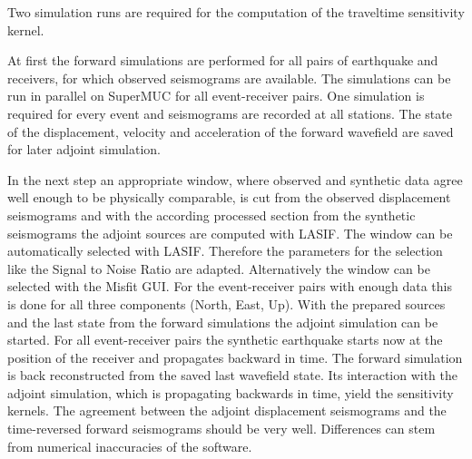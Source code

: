 Two simulation runs are required for the computation of the traveltime sensitivity kernel.

At first the forward simulations are performed for all pairs of earthquake and receivers, for which observed seismograms are available.
The simulations can be run in parallel on SuperMUC for all event-receiver pairs. 
One simulation is required for every event and seismograms are recorded at all stations. %
The state of the displacement, velocity and acceleration of the forward wavefield are saved for later adjoint simulation.

In the next step an appropriate window, where observed and synthetic data agree well enough to be physically comparable,
is cut from the observed displacement seismograms and with the according processed section from the synthetic seismograms 
the adjoint sources are computed with LASIF.
The window can be automatically selected with LASIF. 
Therefore the parameters for the selection like the Signal to Noise Ratio are adapted.
Alternatively the window can be selected with the Misfit GUI.
For the event-receiver pairs with enough data this is done for all three components (North, East, Up).
With the prepared sources and the last state from the forward simulations the adjoint simulation can be started.
For all event-receiver pairs the synthetic earthquake starts now at the position of the receiver and propagates
backward in time.  
The forward simulation is back reconstructed from the saved last wavefield state. 
Its interaction with the adjoint simulation, which is propagating backwards in time,
yield the sensitivity kernels. %
The agreement between the adjoint displacement seismograms and the time-reversed forward seismograms should be very well.
Differences can stem from numerical inaccuracies of the software. %











